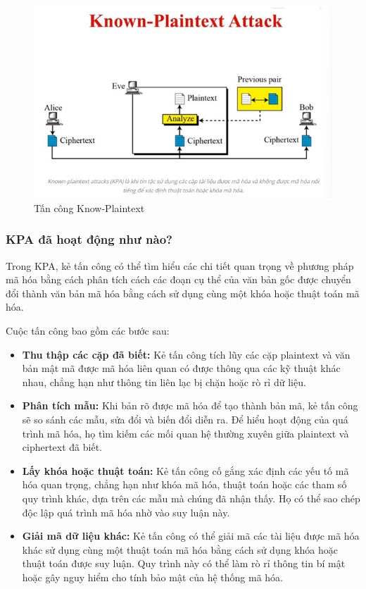 \begin{figure}[H]
    \centering
    \includegraphics[scale=0.9]{pic/huê/kpa.png}
    
    \caption{Tấn công Know-Plaintext}
\end{figure}
\subsubsection{KPA đã hoạt động như nào?
}
Trong KPA, kẻ tấn công có thể tìm hiểu các chi tiết quan trọng về phương pháp mã hóa bằng cách phân tích cách các đoạn cụ thể của văn bản gốc được chuyển đổi thành văn bản mã hóa bằng cách sử dụng cùng một khóa hoặc thuật toán mã hóa.

Cuộc tấn công bao gồm các bước sau:
\begin{itemize}
    \item \textbf{Thu thập các cặp đã biết:}
Kẻ tấn công tích lũy các cặp plaintext và văn bản mật mã được mã hóa liên quan có được thông qua các kỹ thuật khác nhau, chẳng hạn như thông tin liên lạc bị chặn hoặc rò rỉ dữ liệu.
\item \textbf{Phân tích mẫu:}
Khi bản rõ được mã hóa để tạo thành bản mã, kẻ tấn công sẽ so sánh các mẫu, sửa đổi và biến đổi diễn ra. Để hiểu hoạt động của quá trình mã hóa, họ tìm kiếm các mối quan hệ thường xuyên giữa plaintext và ciphertext đã biết.
\item \textbf{Lấy khóa hoặc thuật toán:}
Kẻ tấn công cố gắng xác định các yếu tố mã hóa quan trọng, chẳng hạn như khóa mã hóa, thuật toán hoặc các tham số quy trình khác, dựa trên các mẫu mà chúng đã nhận thấy. Họ có thể sao chép độc lập quá trình mã hóa nhờ vào suy luận này.
\item \textbf{Giải mã dữ liệu khác:}
Kẻ tấn công có thể giải mã các tài liệu được mã hóa khác sử dụng cùng một thuật toán mã hóa bằng cách sử dụng khóa hoặc thuật toán được suy luận. Quy trình này có thể làm rò rỉ thông tin bí mật hoặc gây nguy hiểm cho tính bảo mật của hệ thống mã hóa.

\end{itemize}
